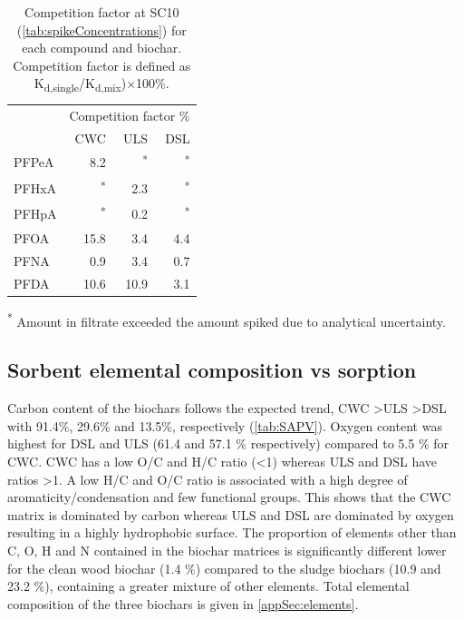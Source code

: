 \begin{table}
\centering
\caption{Competition factor at SC10 (\cref{tab:spikeConcentrations}) for each compound and biochar. Competition factor is defined as K\textsubscript{d,single}/K\textsubscript{d,mix})$\times$100\%.}
\begin{threeparttable}
\label{tab:competition}
\begin{tabular}{lrrr}
\toprule
 & \multicolumn{3}{c}{Competition factor \%} \\ \cmidrule(l){2-4}
 & CWC & ULS & DSL \\ \midrule
PFPeA & 8.2 & \textsuperscript{*} & \textsuperscript{*} \\
PFHxA & \textsuperscript{*} & 2.3 & \textsuperscript{*} \\
PFHpA & \textsuperscript{*} & 0.2 & \textsuperscript{*} \\
PFOA & 15.8 & 3.4 & 4.4 \\
PFNA & 0.9 & 3.4 & 0.7 \\
PFDA & 10.6 & 10.9 & 3.1 \\ \bottomrule
\end{tabular}
\begin{tablenotes}
\item \textsuperscript{*} Amount in filtrate exceeded the amount spiked due to analytical uncertainty.
\end{tablenotes}
\end{threeparttable}
\end{table}

\subsection{Sorbent elemental composition vs sorption}
Carbon content of the biochars follows the expected trend, CWC \textgreater ULS \textgreater DSL with 91.4\%, 29.6\% and 13.5\%, respectively (\cref{tab:SAPV}). Oxygen content was highest for DSL and ULS (61.4 and 57.1 \% respectively) compared to 5.5 \% for CWC. CWC has a low O/C and H/C ratio (\textless 1) whereas ULS and DSL have ratios \textgreater 1. A low H/C and O/C ratio is associated with a high degree of aromaticity/condensation and few functional groups. This shows that the CWC matrix is dominated by carbon whereas ULS and DSL are dominated by oxygen resulting in a highly hydrophobic surface. The proportion of elements other than C, O, H and N contained in the biochar matrices is significantly different lower for the clean wood biochar (1.4 \%) compared to the sludge biochars (10.9 and 23.2 \%), containing a greater mixture of other elements. Total elemental composition of the three biochars is given in \cref{appSec:elements}. 

